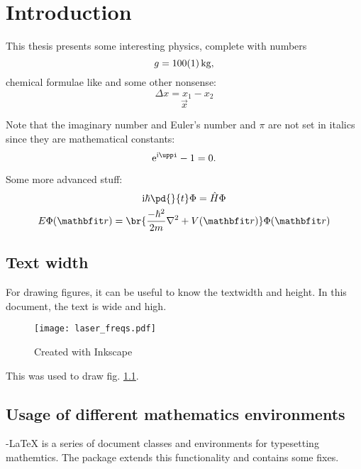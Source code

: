 \chapter{Introduction}\label{ch:introduction}
This thesis presents some interesting physics, complete with numbers
\begin{equation}
	g = \SI{100+-1}{kg}\text{,}
\end{equation}
chemical formulae like  and some other nonsense:
\begin{equation}
	\Delta x = x_1 - x_2
\end{equation}
\begin{equation}
	\vec{x}
\end{equation}

Note that the imaginary number and Euler's number and $\pi$ are not set in italics since they are mathematical constants:
\begin{equation}
	\e^{\i\pi} - 1 = 0\text{.}
\end{equation}

Some more advanced stuff:
\begin{subequations}\label{eq:schroedinger}
	\begin{gather}
		\i \hbar \pd{}{t}\Phi = \op{H}\Phi\\
		E\Phi(\vec{r}) = \br{\frac{-\hbar^2}{2m} \nabla^2 + V(\vec{r}) } \Phi(\vec{r})
	\end{gather}
\end{subequations}

\section{Text width}
For drawing figures, it can be useful to know the textwidth and height. In this document, the text is \the\textwidth {} wide and \the\textheight {} high.

\begin{figure}[tb]
	\centering
	\texttt{[image: laser\_freqs.pdf]}
	\caption{Created with Inkscape}
	\label{fig:laser_freqs}
\end{figure}


This was used to draw fig. \ref{fig:laser_freqs}.




\section{Usage of different mathematics environments}
 {\AmS}-{\LaTeX} is a series of document classes and environments for typesetting mathemtics. The package  extends this functionality and contains some fixes.


